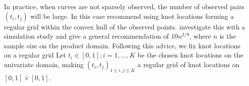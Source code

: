 

 In practice, when curves are not sparsely observed, the number of observed pairs $(t_i, t_j)$ will be large. In this case \cite{CFZ} recommend using knot locations forming a regular grid within the convex hull of the observed points. \cite{Kim:2004tt} investigate this with a simulation study and give a general recommendation of $10n^{2/9}$, where $n$ is the sample size on the product domain. Following this advice, we fix knot locations on a regular grid  Let $t_i \in [0,1]; i=1,\dots, K$ be the chosen knot locations on the univariate domain, making  $(t_i,t_j)_{1\leq i,j \leq K}$ a regular grid of knot locations on $[0,1]\times[0,1]$.




%

